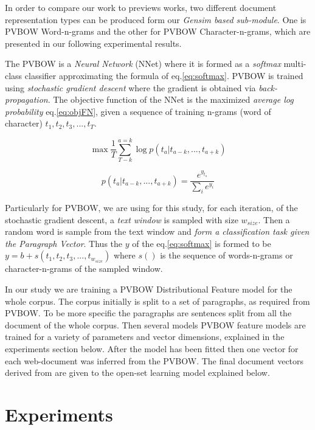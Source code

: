 In order to compare our work to previews works, two different document representation types can be produced form our \textit{Gensim based sub-module}. One is PVBOW Word-n-grams and the other for PVBOW Character-n-grams, which are presented in our following experimental results.

The PVBOW is a \textit{Neural Network} (NNet) where it is formed as a \textit{softmax} multi-class classifier approximating the formula of eq.\ref{eq:softmax}. PVBOW is trained using \textit{stochastic gradient descent} where the gradient is obtained via \textit{back-propagation}. The objective function of the NNet is the maximized \textit{average log probability} eq.\ref{eq:objFN}, given a sequence of training n-grams (word of character) $t_{1}, t_{2}, t_{3}, ..., t_{T}$.

\begin{equation} \label{eq:objFN}
    \max{\frac{1}{T} \sum^{a=k}_{T-k}{\log{p(t_{a}|t_{a-k},...,t_{a+k})}}}
\end{equation}

\begin{equation} \label{eq:softmax}
    p(t_{a}|t_{a-k},...,t_{a+k}) = \frac{e^{y_{t_{a}}}}{\sum_{i}{e^{y_i}}}
\end{equation}

Particularly for PVBOW, we are using for this study, for each iteration, of the stochastic gradient descent, a \textit{text window} is sampled with size $w_{size}$. Then a random word is sample from the text window and \textit{form a classification task given the Paragraph Vector}. Thus the $y$ of the eq.\ref{eq:softmax} is formed to be $y = b + s(t_{1},t_{2},t_{3},...,t_{w_{size}})$ where $s()$ is the sequence of words-n-grams or character-n-grams of the sampled window.

In our study we are training a PVBOW Distributional Feature model for the whole corpus. The corpus initially is split to a set of paragraphs, as required from PVBOW. To be more specific the paragraphs are sentences split from all the document of the whole corpus. Then several models PVBOW feature models are trained for a variety of parameters and vector dimensions, explained in the experiments section below. After the model has been fitted then one vector for each web-document was inferred from the PVBOW. The final document vectors derived from  are given to the open-set learning model explained below.



\section{Experiments}\label{sec:experimental_setup}

